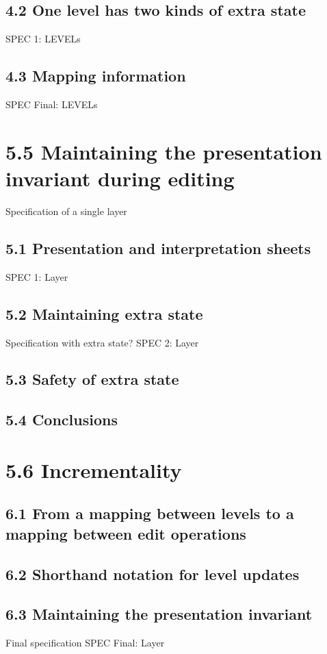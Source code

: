    \subsection{4.2 One level has two kinds of extra state}
      SPEC 1: LEVELs
   \subsection{4.3 Mapping information}
      SPEC Final: LEVELs

\section{5.5 Maintaining the presentation invariant during editing}
                   Specification of a single layer
   \subsection{5.1 Presentation and interpretation sheets}
      SPEC 1: Layer
   \subsection{5.2 Maintaining extra state}
                           Specification with extra state?
      SPEC 2: Layer
   \subsection{5.3 Safety of extra state}
   \subsection{5.4 Conclusions}

\section{5.6 Incrementality}
   \subsection{6.1 From a mapping between levels to a mapping between edit
operations}
   \subsection{6.2 Shorthand notation for level updates}
   \subsection{6.3 Maintaining the presentation invariant}
                  Final specification
        SPEC Final: Layer
